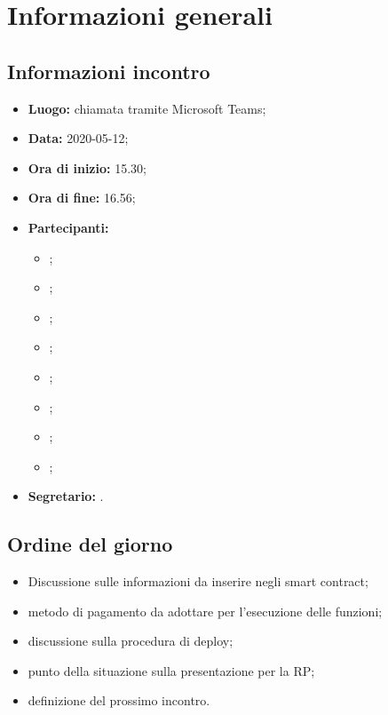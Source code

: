 \section{Informazioni generali}
\subsection{Informazioni incontro}
\begin{itemize}
	\item \textbf{Luogo:} chiamata tramite Microsoft Teams; 
	\item \textbf{Data:} 2020-05-12;
	\item \textbf{Ora di inizio:} 15.30; 
	\item \textbf{Ora di fine:} 16.56; 
	\item \textbf{Partecipanti:}
		\begin{itemize}
			\item \VB; 
			\item \LB; 
			\item \NF; 
			\item \EG; 
			\item \FJ; 
			\item \MP; 
			\item \AS; 
			\item \AZ; 
		\end{itemize}
	\item \textbf{Segretario:} \NF. 
\end{itemize}

\subsection{Ordine del giorno}
\begin{itemize}
	\item Discussione sulle informazioni da inserire negli smart contract;
	\item metodo di pagamento da adottare per l'esecuzione delle funzioni;
	\item discussione sulla procedura di deploy; 
	\item punto della situazione sulla presentazione per la RP; 
	\item definizione del prossimo incontro.
\end{itemize}
